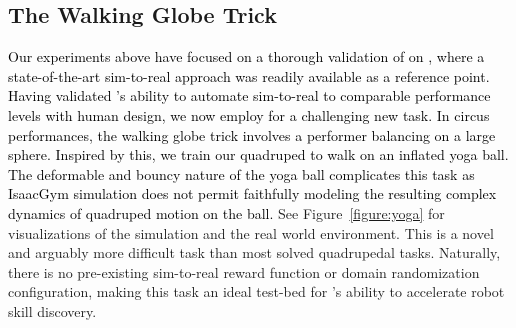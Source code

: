 \documentclass[conference]{IEEEtran}
\newcommand{\jdtext}[1]{\textcolor{black}{#1}}
\begin{document}
\subsection{The Walking Globe Trick}

\jdtext{Our experiments above have focused on a thorough validation of \ourmethod on \newtext{existing tasks}, where a state-of-the-art sim-to-real approach was readily available as a reference point. Having validated \ourmethod's ability to automate sim-to-real to comparable performance levels with human design, we now employ \ourmethod for a challenging new task. In circus performances, the walking globe trick involves a performer balancing on a large sphere. Inspired by this, we train our quadruped to walk on an inflated yoga ball. The deformable and bouncy nature of the yoga ball complicates this task as IsaacGym simulation does not permit faithfully modeling the resulting complex dynamics of quadruped motion on the ball.} See Figure~\ref{figure:yoga} for visualizations of the simulation and the real world environment. This is a novel and arguably more difficult task than most solved quadrupedal tasks. Naturally, there is no pre-existing sim-to-real reward function or domain randomization configuration, making this task an ideal test-bed for \ourmethod's ability to accelerate robot skill discovery. 




\begin{table}
\small
\centering
{}
  \caption{\textbf{\ourmethod results on walking globe.} In both simulation and the real world, the \ourmethod policy can balance and walk on the yoga ball for longer than 10 seconds.}
  \label{table:globe-walking}
\end{table}
\end{document}
